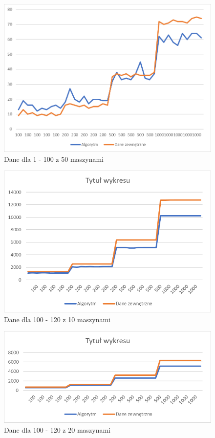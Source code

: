 \begin{figure}[h]
    \centering
    \includegraphics[scale=0.3]{1-100_50.png}
    \caption{Dane dla 1 - 100 z 50 maszynami}
    \label{1-100_50}
\end{figure}



\begin{figure}[h]
    \centering
    \includegraphics[scale=0.3]{100-120_10.png}
    \caption{Dane dla 100 - 120 z 10 maszynami}
    \label{100-120_10}
\end{figure}

\begin{figure}[h]
    \centering
    \includegraphics[scale=0.3]{100-120_20.png}
    \caption{Dane dla 100 - 120 z 20 maszynami}
    \label{100-120_20}
\end{figure}

